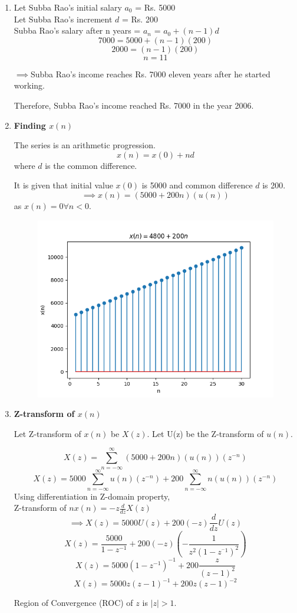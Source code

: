 \documentclass[journal,12pt,twocolumn]{IEEEtran}
\theoremstyle{remark}
\begin{document}
\begin{enumerate}
\item
Let Subba Rao's initial salary $a_0$ = Rs. 5000
\\
Let Subba Rao's increment $d$ = Rs. 200
\\
Subba Rao's salary after n years = $a_n$ = $a_0 + (n - 1)d$
\\
\[7000 = 5000 + (n - 1)(200)\]
\[2000 = (n - 1)(200)\]
\[n = 11\]

$\implies$Subba Rao's income reaches Rs. 7000 eleven years after he started working.

Therefore, Subba Rao's income reached Rs. 7000 in the year 2006.

\item \textbf{Finding $x(n)$}

The series is an arithmetic progression.
\[x(n) = x(0) + nd\]
where $d$ is the common difference.

It is given that initial value $x(0)$ is 5000 and common difference $d$ is 200.
\[\implies x(n) = (5000 + 200n)(u(n))\]
as $x(n) = 0 \forall n < 0$.

\begin{figure}[h!]
    \centering
    \includegraphics[width=\columnwidth]{figs/10_5_2_19.png}
\end{figure}

\item \textbf{Z-transform of $x(n)$}

Let Z-transform of $x(n)$ be $X(z)$. Let U(z) be the Z-transform of $u(n)$.

\[X(z) = \sum_{n = -\infty}^{\infty} (5000 + 200n)(u(n))(z^{-n})\]
\[X(z) = 5000\sum_{n = -\infty}^{\infty} u(n)(z^{-n}) + 200\sum_{n = -\infty}^{\infty}n(u(n))(z^{-n})\]
Using differentiation in Z-domain property,\\Z-transform of $nx(n) = -z\frac{d}{dz}X(z)$
\[\implies X(z) = 5000U(z) + 200(-z)\frac{d}{dz} U(z)\]
\[X(z) = \frac{5000}{1 - z^{-1}} + 200(-z)(-\frac{1}{z^2(1-z^{^-1})^2})\]
\[X(z) = 5000(1 - z^{-1})^{-1} + 200\frac{z}{(z - 1)^2}\]
\[X(z) = 5000z(z - 1)^{-1} + 200z(z - 1)^{-2}\]

Region of Convergence (ROC) of $z$ is $|z| > 1$.

\end{enumerate}
\end{document}

